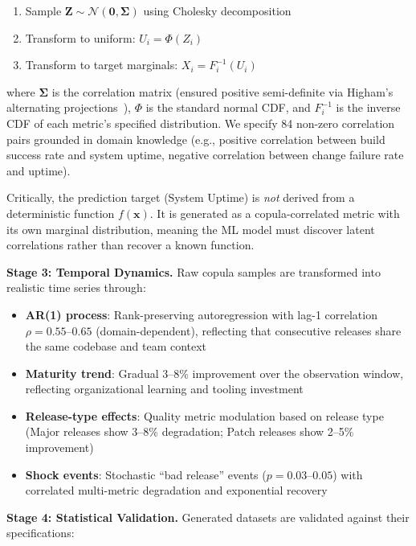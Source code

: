 \documentclass[technologies,article,submit,pdftex,moreauthors]{Definitions/mdpi}
\begin{document}
\begin{enumerate}
\def\labelenumi{\arabic{enumi}.}
\item
  Sample
  \(\mathbf{Z} \sim \mathcal{N}(\mathbf{0}, \boldsymbol{\Sigma})\) using
  Cholesky decomposition
\item
  Transform to uniform: \(U_i = \Phi(Z_i)\)
\item
  Transform to target marginals: \(X_i = F_i^{-1}(U_i)\)
\end{enumerate}

where \(\boldsymbol{\Sigma}\) is the correlation matrix (ensured
positive semi-definite via Higham's alternating
projections~\cite{higham2002}), \(\Phi\) is the standard normal CDF,
and \(F_i^{-1}\) is the inverse CDF of each metric's specified
distribution. We specify 84 non-zero correlation pairs grounded in
domain knowledge (e.g., positive correlation between build success rate
and system uptime, negative correlation between change failure rate and
uptime).

Critically, the prediction target (System Uptime) is \emph{not} derived
from a deterministic function \(f(\mathbf{x})\). It is generated as a
copula-correlated metric with its own marginal distribution, meaning the
ML model must discover latent correlations rather than recover a known
function.

\textbf{Stage 3: Temporal Dynamics.} Raw copula samples are transformed
into realistic time series through:

\begin{itemize}
\item
  \textbf{AR(1) process}: Rank-preserving autoregression with lag-1
  correlation \(\rho = 0.55\)--\(0.65\) (domain-dependent), reflecting
  that consecutive releases share the same codebase and team context
\item
  \textbf{Maturity trend}: Gradual 3--8\% improvement over the
  observation window, reflecting organizational learning and tooling
  investment
\item
  \textbf{Release-type effects}: Quality metric modulation based on
  release type (Major releases show 3--8\% degradation; Patch releases
  show 2--5\% improvement)
\item
  \textbf{Shock events}: Stochastic ``bad release'' events
  (\(p = 0.03\)--\(0.05\)) with correlated multi-metric degradation and
  exponential recovery
\end{itemize}

\textbf{Stage 4: Statistical Validation.} Generated datasets are
validated against their specifications:
\end{document}
